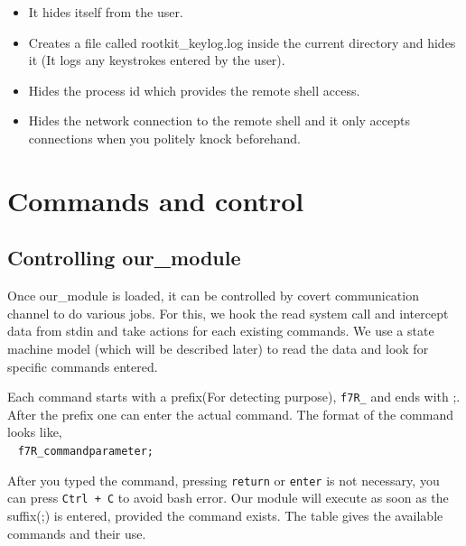 \documentclass[10pt, letterpaper]{scrartcl}
\begin{document}
\begin{itemize}
    \item It hides itself from the user. 
    \item Creates a  file called rootkit\_keylog.log inside the current directory and hides it (It logs any keystrokes entered by the user).
    \item Hides the process id which provides the remote shell access. 
    \item Hides the network connection to the remote shell and it only accepts connections when you politely knock beforehand.
    \end{itemize}


\section{Commands and control}
    \subsection{Controlling our\_module}
    Once our\_module is loaded, it can be controlled by covert communication channel to do various jobs. 
For this, we hook the read system call and intercept data from stdin and take actions for each existing  commands. 
We use a state machine model (which will be described later) to read the data and look for specific commands entered. 

Each command starts with a prefix(For detecting purpose), \texttt{f7R\_} and ends with ;. 
After the prefix one can enter the actual command. The format of the command looks like,
\\~
\texttt{f7R\_command\textvisiblespace parameter;}

After you typed the command, pressing \texttt{return} or \texttt{enter} is not necessary, you can press \texttt{Ctrl + C} to avoid bash error. 
Our module will execute as soon as the suffix(;) is entered, provided the command exists. 
The table %
gives the available commands and their use. 
\end{document}

